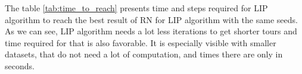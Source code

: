 	
	
	The table \ref{tab:time_to_reach} presents time and steps required for LIP algorithm to reach the best result of RN for LIP algorithm with the same seeds. As we can see, LIP algorithm needs a lot less iterations to get shorter tours and time required for that is also favorable. It is especially visible with smaller datasets, that do not need a lot of computation, and times there are only in seconds.